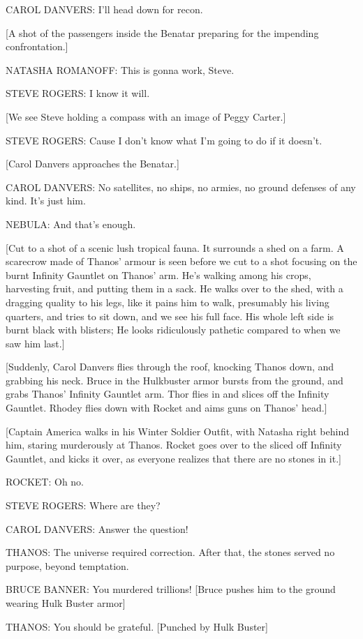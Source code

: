 CAROL DANVERS: I'll head down for recon.

[A shot of the passengers inside the Benatar preparing for the impending confrontation.]

NATASHA ROMANOFF: This is gonna work, Steve.

STEVE ROGERS: I know it will.

[We see Steve holding a compass with an image of Peggy Carter.]

STEVE ROGERS: Cause I don't know what I'm going to do if it doesn't.

[Carol Danvers approaches the Benatar.]

CAROL DANVERS: No satellites, no ships, no armies, no ground defenses of any kind. It's just him.

NEBULA: And that's enough.

[Cut to a shot of a scenic lush tropical fauna. It surrounds a shed on a farm. A scarecrow made of Thanos' armour is seen before we cut to a shot focusing on the burnt Infinity Gauntlet on Thanos' arm. He's walking among his crops, harvesting fruit, and putting them in a sack. He walks over to the shed, with a dragging quality to his legs, like it pains him to walk, presumably his living quarters, and tries to sit down, and we see his full face. His whole left side is burnt black with blisters; He looks ridiculously pathetic compared to when we saw him last.]

[Suddenly, Carol Danvers flies through the roof, knocking Thanos down, and grabbing his neck. Bruce in the Hulkbuster armor bursts from the ground, and grabs Thanos' Infinity Gauntlet arm. Thor flies in and slices off the Infinity Gauntlet. Rhodey flies down with Rocket and aims guns on Thanos' head.]

[Captain America walks in his Winter Soldier Outfit, with Natasha right behind him, staring murderously at Thanos. Rocket goes over to the sliced off Infinity Gauntlet, and kicks it over, as everyone realizes that there are no stones in it.]

ROCKET: Oh no.

STEVE ROGERS: Where are they?

CAROL DANVERS: Answer the question!

THANOS: The universe required correction. After that, the stones served no purpose, beyond temptation.

BRUCE BANNER: You murdered trillions! [Bruce pushes him to the ground wearing Hulk Buster armor]

THANOS: You should be grateful. [Punched by Hulk Buster]

